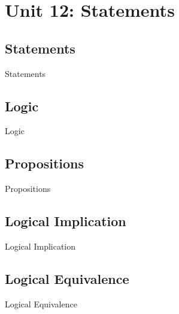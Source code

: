 \chapter{Unit 12: Statements}
\label{chap:unit12}

\section{Statements}
\label{sec:statements}

Statements

\section{Logic}
\label{sec:logic}

Logic

\section{Propositions}
\label{sec:propositions}

Propositions

\section{Logical Implication}
\label{sec:logical-implication}

Logical Implication

\section{Logical Equivalence}
\label{sec:logical-equivalence}

Logical Equivalence

